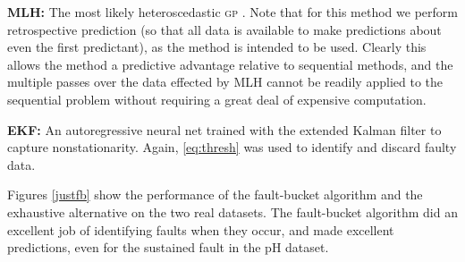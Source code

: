 \documentclass{article} %
\newcommand{\given}{\!\ensuremath{\mid}\!}
\newcommand{\bm}[1]{\ensuremath{\mathbf{#1}}}
\newcommand{\acro}[1]{\textsc{#1}}
\newcommand{\vect}[1]{\bm{#1}}
\newcommand{\vy}{\vect{y}}
\newcommand{\mean}[2]{{m}(#1\given#2)}
\begin{document}

{\bf MLH:} 
The most likely heteroscedastic  \acro{gp} \citep{kersting2007most}. Note that for this method we perform retrospective prediction (so that all data is available to make predictions about even the first predictant), as the method is intended to be used. Clearly this allows the method a predictive advantage relative to sequential methods, and the multiple passes over the data effected by \acro{MLH} cannot be readily applied to the sequential problem without requiring a great deal of expensive computation. 

{\bf EKF:}
An autoregressive neural net trained with the extended Kalman filter to capture nonstationarity. Again, \eqref{eq:thresh} was used to identify and discard faulty data.






Figures \ref{justfb} show the performance of the
fault-bucket algorithm and the exhaustive alternative on the two real datasets. The fault-bucket algorithm did an excellent
job of identifying faults when they occur, and made excellent
predictions, even for the sustained fault in the pH dataset. 
\end{document}
